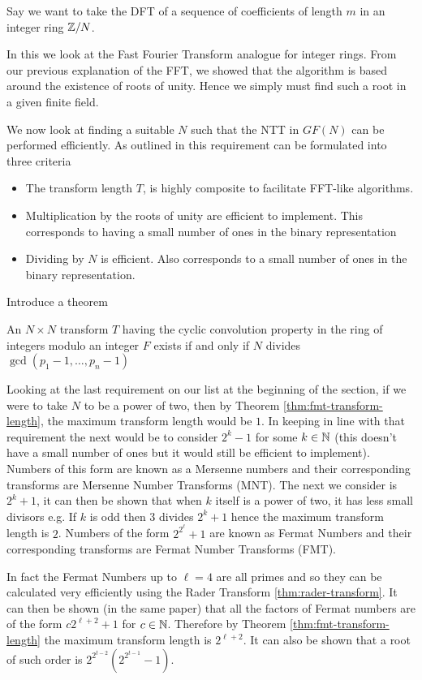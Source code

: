 Say we want to take the DFT of a sequence of coefficients of length $m$ in an integer ring ${\mathbb Z}/N$.

In this we look at the Fast Fourier Transform analogue for integer rings. From our previous explanation of the FFT, we showed that the algorithm is based around the existence of roots of unity. Hence we simply must find such a root in a given finite field.

We now look at finding a suitable $N$ such that the NTT in $GF(N)$ can be performed efficiently. As outlined in \cite{intro-to-fmt} this requirement can be formulated into three criteria
\begin{itemize}
\item The transform length $T$, is highly composite to facilitate FFT-like algorithms.
\item Multiplication by the roots of unity are efficient to implement. This corresponds to having a small number of ones in the binary representation
\item Dividing by $N$ is efficient. Also corresponds to a small number of ones in the binary representation.
\end{itemize}

Introduce a theorem
\begin{theorem}\label{thm:fmt-transform-length}
    An $N \times N$ transform $T$ having the cyclic convolution property in the ring of integers modulo an integer $F$ exists if and only if $N$ divides $\gcd(p_1 - 1, \ldots, p_n - 1)$
\end{theorem}

Looking at the last requirement on our list at the beginning of the section, if we were to take $N$ to be a power of two, then by Theorem \ref{thm:fmt-transform-length}, the maximum transform length would be $1$. In keeping in line with that requirement the next would be to consider $2^k - 1$  for some $k \in {\mathbb N}$ (this doesn't have a small number of ones but it would still be efficient to implement). Numbers of this form are known as a Mersenne numbers and their corresponding transforms are Mersenne Number Transforms (MNT). The next we consider is $2^k + 1$, it can then be shown that when $k$ itself is a power of two, it has less small divisors e.g. If $k$ is odd then $3$ divides $2^k + 1$ hence the maximum transform length is $2$. Numbers of the form $2^{2^\ell} + 1$ are known as Fermat Numbers and their corresponding transforms are Fermat Number Transforms (FMT).

In fact the Fermat Numbers up to $\ell = 4$ are all primes and so they can be calculated very efficiently using the Rader Transform \ref{thm:rader-transform}. It can then be shown (in the same paper) that all the factors of Fermat numbers are of the form $c2^{\ell + 2} + 1$ for $c \in {\mathbb N}$. Therefore by Theorem \ref{thm:fmt-transform-length} the maximum transform length is $2^{\ell + 2}$. It can also be shown that a root of such order is $2^{2^{t-2}}(2^{2^{t-1}} - 1)$.

